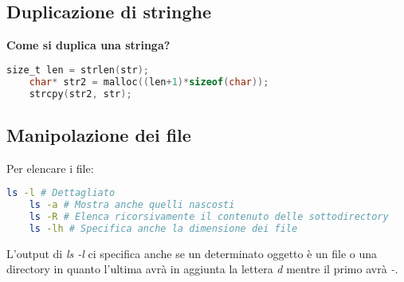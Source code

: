 \subsection{Duplicazione di stringhe}
\textbf{Come si duplica una stringa?}\\
\begin{lstlisting}[language=C]
	size_t len = strlen(str);
	char* str2 = malloc((len+1)*sizeof(char));
	strcpy(str2, str);
\end{lstlisting}

\subsection{Manipolazione dei file}
Per elencare i file:
\begin{lstlisting}[language=BASH]
	ls -l # Dettagliato
	ls -a # Mostra anche quelli nascosti
	ls -R # Elenca ricorsivamente il contenuto delle sottodirectory
	ls -lh # Specifica anche la dimensione dei file
\end{lstlisting}
L'output di \textit{ls -l} ci specifica anche se un determinato oggetto è un file o una directory in quanto l'ultima avrà in aggiunta la lettera \textit{d} mentre il primo avrà \textit{-.}